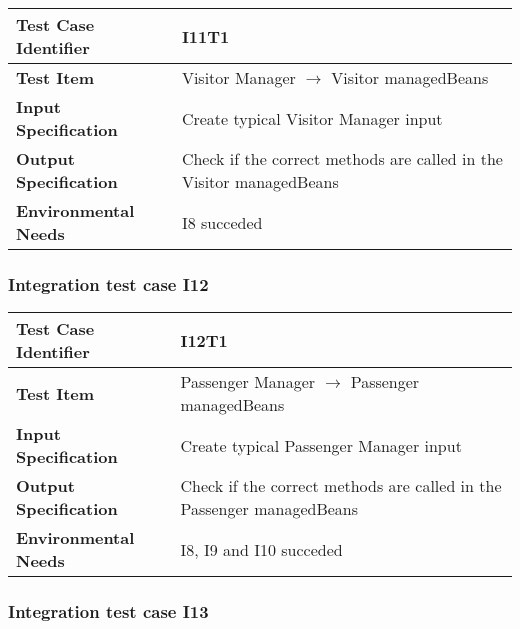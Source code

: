 \begin{table}[!htbp]
\begin{center}
\begin{tabular}[t]{p{}p{}}

\hline
\textbf{Test Case Identifier} & I11T1 \\
\hline
\textbf{Test Item} & Visitor Manager $\rightarrow$ Visitor managedBeans \\
\hline
\textbf{Input Specification} & Create typical Visitor Manager input  \\
\hline
\textbf{Output Specification} & Check if the correct methods are called in the Visitor managedBeans \\
\hline
\textbf{Environmental Needs} & I8 succeded \\
\hline

\end{tabular}
\end{center}
\end{table}
\clearpage


\subsubsection{Integration test case I12}

\begin{table}[!htbp]
\begin{center}
\begin{tabular}[t]{p{}p{}}

\hline
\textbf{Test Case Identifier} & I12T1 \\
\hline
\textbf{Test Item} & Passenger Manager $\rightarrow$ Passenger managedBeans \\
\hline
\textbf{Input Specification} & Create typical Passenger Manager input  \\
\hline
\textbf{Output Specification} & Check if the correct methods are called in the Passenger managedBeans \\
\hline
\textbf{Environmental Needs} & I8, I9 and I10 succeded \\
\hline

\end{tabular}
\end{center}
\end{table}
\clearpage


\subsubsection{Integration test case I13}

